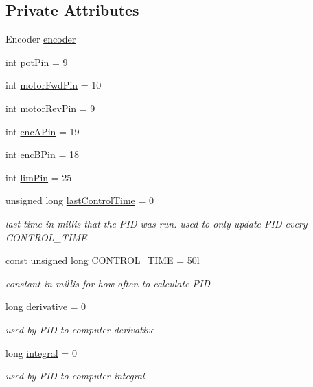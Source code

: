 \subsection*{Private Attributes}
\begin{DoxyCompactItemize}
\item 
Encoder \hyperlink{classArm_afe912e5b20439c082abb66920658805c}{encoder}
\item 
int \hyperlink{classArm_a73ec96a3c36efbf71fe5301b82e9fd4d}{pot\-Pin} = 9
\item 
int \hyperlink{classArm_ad4a5718ff10ff30ece49108effc28dd2}{motor\-Fwd\-Pin} = 10
\item 
int \hyperlink{classArm_a0d5927881e33ce4e039a71e83d7caf6a}{motor\-Rev\-Pin} = 9
\item 
int \hyperlink{classArm_ad36ceeef302fda4b8e162feae7961c41}{enc\-A\-Pin} = 19
\item 
int \hyperlink{classArm_ab1111e111610b38214e703cd88887f24}{enc\-B\-Pin} = 18
\item 
int \hyperlink{classArm_aade413d7d638bff08bcc0c9ac50818e1}{lim\-Pin} = 25
\item 
unsigned long \hyperlink{classArm_a99d553dd144c5fd2bf8b4c68a66fea1b}{last\-Control\-Time} = 0
\begin{DoxyCompactList}\small\item\em last time in millis that the P\-I\-D was run. used to only update P\-I\-D every C\-O\-N\-T\-R\-O\-L\-\_\-\-T\-I\-M\-E \end{DoxyCompactList}\item 
const unsigned long \hyperlink{classArm_ae85014b5f9a8698790faa73bae76217c}{C\-O\-N\-T\-R\-O\-L\-\_\-\-T\-I\-M\-E} = 50l
\begin{DoxyCompactList}\small\item\em constant in millis for how often to calculate P\-I\-D \end{DoxyCompactList}\item 
long \hyperlink{classArm_ad8cf7ca1ae47f7ddffcffb02889c8c69}{derivative} = 0
\begin{DoxyCompactList}\small\item\em used by P\-I\-D to computer derivative \end{DoxyCompactList}\item 
long \hyperlink{classArm_aef466ce8350e1d73ed9a7b529512e90c}{integral} = 0
\begin{DoxyCompactList}\small\item\em used by P\-I\-D to computer integral \end{DoxyCompactList}\item 

\end{DoxyCompactItemize}
